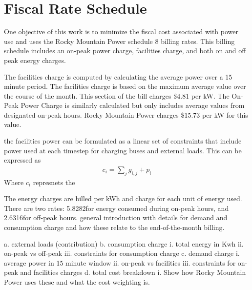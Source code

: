 \section{Fiscal Rate Schedule}
One objective of this work is to minimize the fiscal cost associated with power use and uses the Rocky Mountain Power schedule 8 billing rates. This billing schedule includes an on-peak power charge, facilities charge, and both on and off peak energy charges.
\par The facilities charge is computed by calculating the average power over a 15 minute period.  The facilities charge is based on the maximum average value over the course of the month.  This section of the bill charges \$4.81 per kW. The On-Peak Power Charge is similarly calculated but only includes average values from designated on-peak hours.  Rocky Mountain Power charges \$15.73 per kW for this value.
\par the facilities power can be formulated as a linear set of constraints that include power used at each timestep for charging buses and external loads.  This can be expressed as 
\begin{align*}
	c_i = \sum_j{g_{i,j}} + p_i
\end{align*}
Where $c_i$ represnets the 
\par  The energy charges are billed per kWh and charge for each unit of energy used.  There are two rates: 5.8282\textcent for energy consumed during on-peak hours, and 2.6316\textcent for off-peak hours.
general introduction with details for demand and consumption charge and how these relate to the end-of-the-month billing.

    a. external loads (contribution)
    b. consumption charge
        i. total energy in Kwh
	ii. on-peak vs off-peak
	iii. constraints for consumption charge
    c. demand charge
        i. average power in 15 minute window
	ii. on-peak vs facilities 
	iii. constraints for on-peak and facilities charges
    d. total cost breakdown
        i. Show how Rocky Mountain Power uses these and what the cost weighting is.
